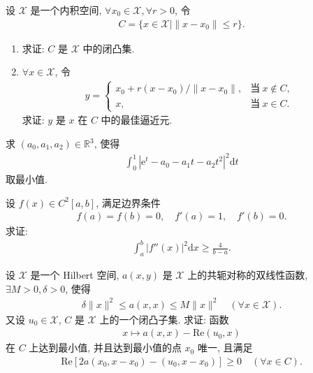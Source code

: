 \documentclass[../../main.tex]{subfiles}%
\begin{document}
\begin{example}
设 $\mathscr{X}$ 是一个内积空间, $\forall x_0\in\mathscr{X},\forall r>0$, 令
\begin{align*}
C=\{x\in\mathscr{X}\mid\|x-x_0\|\leqslant r\}.
\end{align*}
\begin{enumerate}[(1)]
\item 求证: $C$ 是 $\mathscr{X}$ 中的闭凸集.
\item $\forall x\in\mathscr{X}$, 令
\begin{align*}
y=
\begin{cases}
x_0+r(x-x_0)/\|x-x_0\|, & \text{当}\ x\notin C, \\
x, & \text{当}\ x\in C.
\end{cases}
\end{align*}
求证: $y$ 是 $x$ 在 $C$ 中的最佳逼近元.
\end{enumerate}
\end{example}

\begin{example}
求 $(a_0,a_1,a_2)\in\mathbb{R}^3$, 使得
\begin{align*}
\int_0^1|\mathrm{e}^t-a_0-a_1t-a_2t^2|^2\mathrm{d}t
\end{align*}
取最小值.
\end{example}

\begin{example}
设 $f(x)\in C^2[a,b]$, 满足边界条件
\begin{align*}
f(a)=f(b)=0,\quad f'(a)=1,\quad f'(b)=0.
\end{align*}
求证:
\begin{align*}
\int_a^b|f''(x)|^2\mathrm{d}x\geqslant\frac{4}{b-a}.
\end{align*}
\end{example}

\begin{proposition}[变分不等式]
设 $\mathscr{X}$ 是一个 Hilbert 空间, $a(x,y)$ 是 $\mathscr{X}$ 上的共轭对称的双线性函数, $\exists M>0,\delta>0$, 使得
\begin{align*}
\delta\|x\|^2\leqslant a(x,x)\leqslant M\|x\|^2\quad(\forall x\in\mathscr{X}).
\end{align*}
又设 $u_0\in\mathscr{X}$, $C$ 是 $\mathscr{X}$ 上的一个闭凸子集. 求证: 函数
\begin{align*}
x\mapsto a(x,x)-\text{Re}(u_0,x)
\end{align*}
在 $C$ 上达到最小值, 并且达到最小值的点 $x_0$ 唯一, 且满足
\begin{align*}
\text{Re}\left[2a(x_0,x-x_0)-(u_0,x-x_0)\right]\geqslant 0\quad(\forall x\in C).
\end{align*}
\end{proposition}
\end{document}
